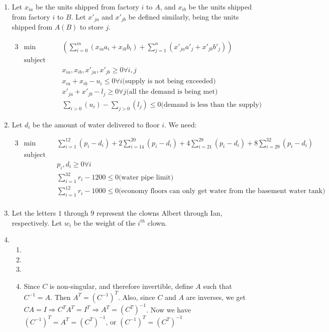 \documentclass[10pt,english]{article}
\begin{document}
\begin{enumerate}
\begin{enumerate}
    
    
    \item 
\end{enumerate}


\pagebreak

\item Let $x_{ia}$ be the units shipped from factory $i$ to $A$, and $x_{ib}$ be the units shipped from factory $i$ to $B$. Let $x'_{ja}$ and $x'_{jb}$ be defined similarly, being the units shipped from $A (B)$ to store $j$.

\begin{alignat*}{3}
    &\text{min}&& \left(\sum_{i=0}^m(x_{ia}a_i+x_{ib}b_i)+\sum_{j=1}^n(x'_{ja}a'_j+x'_{jb}b'_j)\right)\\ 
    &\text{subject to}\\ 
    &&& x_{ia},x_{ib},x'_{ja},x'_{jb}\geq0 \forall i,j\\
    &&& x_{ia}+x_{ib}-u_i\leq 0 \forall i\text{(supply is not being exceeded)}\\ 
    &&& x'_{ja}+x'_{jb}-l_j\geq 0\forall j \text{(all the demand is being met)}\\ 
    &&& \sum_{i>0}(u_i)-\sum_{j>0}(l_j)\leq0\text{(demand is less than the supply)}
\end{alignat*}



\item Let $d_i$ be the amount of water delivered to floor $i$. We need:

\begin{alignat*}{3}
    &\text{min}&& \sum_{i=1}^12(p_i-d_i)+2\sum_{i=14}^20(p_i-d_i)+4\sum_{i=21}^28(p_i-d_i)+8\sum_{i=29}^32(p_i-d_i)\\ 
    &\text{subject to}\\ 
    &&& p_i,d_i\geq0\forall i\\
    &&& \sum_{i=1}^32r_i-1200\leq0 \text{(water pipe limit)}\\ 
    &&& \sum_{i=1}^12r_i-1000\leq0 \text{(economy floors can only get water from the basement water tank)}\\ 
\end{alignat*}



\item Let the letters $1$ through $9$ represent the clowns Albert through Ian, respectively. Let $w_i$ be the weight of the $i^{th}$ clown.




\item \begin{enumerate}
    \item 
    \item 
    \item 
    \item Since $C$ is non-singular, and therefore invertible, define $A$ such that $C^{-1}=A$. Then $A^T=(C^{-1})^T$. Also, since $C$ and $A$ are inverses, we get $CA=I\Rightarrow C^TA^T=I^T\Rightarrow A^T=(C^T)^{-1}$. Now we have $(C^{-1})^T=A^T=(C^T)^{-1}$, or $(C^{-1})^T=(C^T)^{-1}$
    

\end{enumerate}
\end{enumerate}
\end{document}
